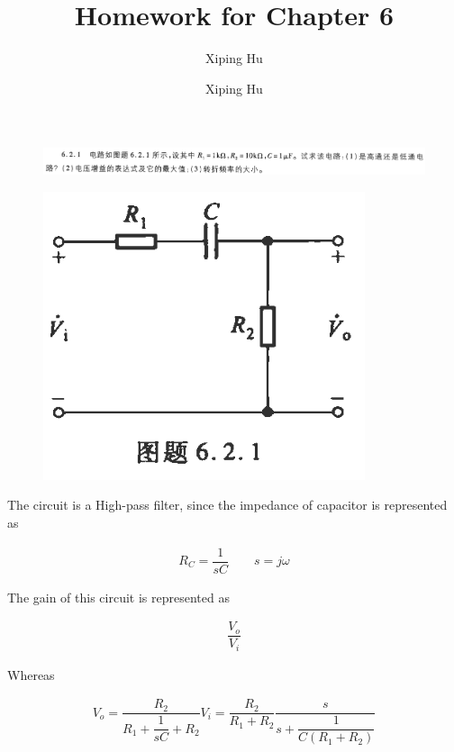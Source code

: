 \documentclass{article}
\author{Xiping Hu}
\author{Xiping Hu}
\affil{https://hxp.plus/}
\title{Homework for Chapter 6}
\begin{document}
\maketitle

\begin{figure}[H]
  \centering
  \includegraphics[width=\linewidth]{figures/Problem621}
  \label{fig:}
\end{figure}

\begin{figure}[H]
  \centering
  \includegraphics[width=0.4\linewidth]{figures/Problem6211}
  \label{fig:}
\end{figure}

The circuit is a High-pass filter, since the impedance of capacitor is represented as

\begin{equation*}
  \begin{aligned}
    R_C = \dfrac{1}{s C} \quad\quad s = j \omega 
  \end{aligned}
\end{equation*}

The gain of this circuit is represented as

\begin{equation*}
  \begin{aligned}
    \dfrac{V_o}{V_i}
  \end{aligned}
\end{equation*}

Whereas

\begin{equation*}
  \begin{aligned}
    V_o = \dfrac{R_2}{R_1 + \dfrac{1}{sC} + R_2 } V_i = \dfrac{R_2}{R_1 + R_2} \dfrac{s}{s + \dfrac{1}{C \left( R_1 + R_2 \right)} }   
  \end{aligned}
\end{equation*}
\end{document}
